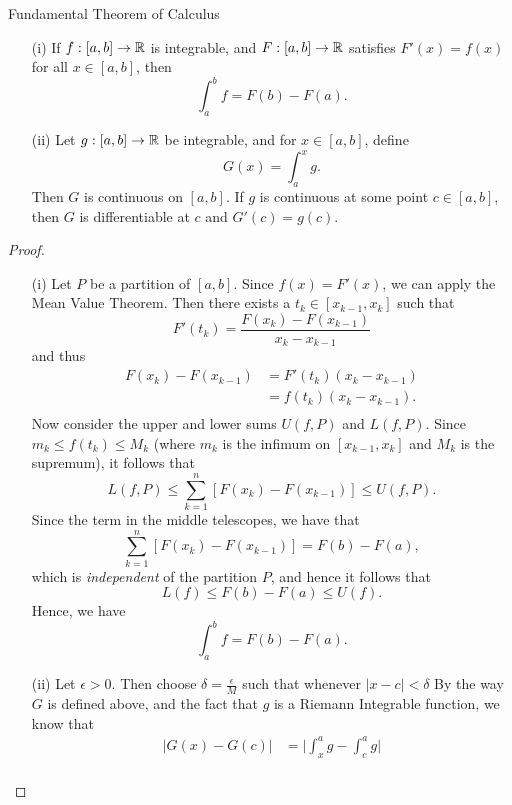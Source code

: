 \begin{theorem}{Fundamental Theorem of Calculus}{}
	\begin{enumerate}
		\item[(i)] If \( f: [a,b] \to \mathbb{R}  \) is integrable, and \( F : [a,b] \to \mathbb{R}  \) satisfies \( F'(x) = f(x)  \) for all \( x \in [a,b]  \), then 
			\[  \int_{ a }^{ b } f = F(b) - F(a). \]
		\item[(ii)] Let \( g: [a,b] \to \mathbb{R}  \) be integrable, and for \( x \in [a,b]  \), define 
			\[  G(x) = \int_{ a }^{ x } g. \]
			Then \( G  \) is continuous on \( [a,b]  \). If \( g  \) is continuous at some point \( c \in [a,b]  \), then \( G  \) is differentiable at \( c  \) and \( G'(c) = g(c)  \).
	\end{enumerate}
	\end{theorem}
\begin{proof}
\begin{enumerate}
	\item[(i)] Let \( P  \) be a partition of \( [a,b]  \). Since \( f(x) = F'(x)  \), we can apply the Mean Value Theorem. Then there exists a \( t_{k } \in [x_{k-1}, x_{k }] \) such that 
		\[  F'(t_{k } ) =  \frac{ F(x_{k } ) - F(x_{k-1})}{  x_{k} - x_{k-1} }\] and thus 
		\begin{align*}
		    F(x_{k } ) - F(x_{k-1}) &= F'(t_{ k }) ( x_{k } - x_{k-1})  \\
									&= f(t_{k }) (x_{k} - x_{k-1}). \\
		\end{align*}
		Now consider the upper and lower sums \( U(f,P)  \) and \( L(f,P)  \). Since \( m_{k } \leq f(t_{k }) \leq M_{k }   \) (where \( m_{k }  \) is the infimum on \( [ x_{k-1}, x_{k }]  \) and \( M_{k }  \) is the supremum), it follows that 
		\[  L(f,P) \leq \sum_{ k=1 }^{ n } [F(x_{k }) - F(x_{k-1})] \leq U(f,P).\]
		Since the term in the middle telescopes, we have that 
		\[  \sum_{ k=1 }^{ n } [F(x_{k}) - F(x_{k-1})] = F(b) - F(a),  \]
		which is \textit{independent} of the partition \( P  \), and hence it follows that 
		\[  L(f) \leq F(b) - F(a) \leq U(f). \]
		Hence, we have 
		\[  \int_{ a }^{ b } f = F(b) - F(a). \]
	\item[(ii)] Let \( \epsilon > 0 \). Then choose \( \delta = \frac{ \epsilon  }{ M  }   \) such that whenever \( | x - c  | < \delta \) By the way \( G  \) is defined above, and the fact that \( g  \) is a Riemann Integrable function,  we know that
		\begin{align*}
		    \Big| G(x) - G(c)  \Big| &= \Big| \int_{ x }^{ a } g - \int_{ c }^{ a } g  \Big|  \\

\end{align*}
\end{enumerate}
\end{proof}
